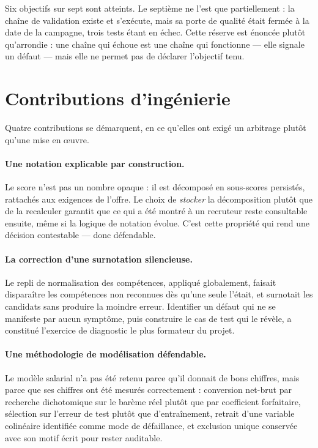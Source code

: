 Six objectifs sur sept sont atteints. Le septième ne l'est que partiellement :
la chaîne de validation existe et s'exécute, mais sa porte de qualité était
fermée à la date de la campagne, trois tests étant en échec. Cette réserve est
énoncée plutôt qu'arrondie : une chaîne qui échoue est une chaîne qui
fonctionne — elle signale un défaut — mais elle ne permet pas de déclarer
l'objectif tenu.

\section*{Contributions d'ingénierie}

Quatre contributions se démarquent, en ce qu'elles ont exigé un arbitrage
plutôt qu'une mise en œuvre.

\paragraph{Une notation explicable par construction.} Le score n'est pas un
nombre opaque : il est décomposé en sous-scores persistés, rattachés aux
exigences de l'offre. Le choix de \emph{stocker} la décomposition plutôt que de
la recalculer garantit que ce qui a été montré à un recruteur reste consultable
ensuite, même si la logique de notation évolue. C'est cette propriété qui rend
une décision contestable — donc défendable.

\paragraph{La correction d'une surnotation silencieuse.} Le repli de
normalisation des compétences, appliqué globalement, faisait disparaître les
compétences non reconnues dès qu'une seule l'était, et surnotait les candidats
sans produire la moindre erreur. Identifier un défaut qui ne se manifeste par
aucun symptôme, puis construire le cas de test qui le révèle, a constitué
l'exercice de diagnostic le plus formateur du projet.

\paragraph{Une méthodologie de modélisation défendable.} Le modèle salarial
n'a pas été retenu parce qu'il donnait de bons chiffres, mais parce que ses
chiffres ont été mesurés correctement : conversion net-brut par recherche
dichotomique sur le barème réel plutôt que par coefficient forfaitaire,
sélection sur l'erreur de test plutôt que d'entraînement, retrait d'une
variable colinéaire identifiée comme mode de défaillance, et exclusion unique
conservée avec son motif écrit pour rester auditable.

